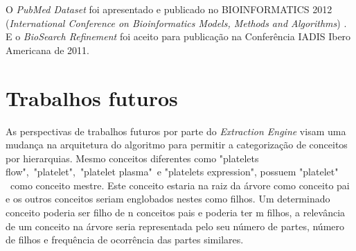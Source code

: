 O \emph{PubMed Dataset} foi apresentado e publicado no BIOINFORMATICS 2012 (\emph{International Conference on Bioinformatics Models, Methods and Algorithms}) \cite{Lassounski2012}. E o \emph{BioSearch Refinement} foi aceito para publicação na Conferência IADIS Ibero Americana de 2011.

\section{Trabalhos futuros}
As perspectivas de trabalhos futuros por parte do \emph{Extraction Engine} visam uma mudança na arquitetura do algoritmo para permitir a categorização de conceitos por hierarquias. Mesmo conceitos diferentes como "platelets flow",\ "platelet",\ "platelet plasma"\ e "platelets expression", possuem
 "platelet" \ como conceito mestre. Este conceito estaria na raiz da árvore como conceito pai e os outros conceitos seriam englobados nestes como filhos. Um determinado conceito poderia ser filho de n conceitos pais e poderia ter m filhos, a relevância de um conceito na árvore seria representada pelo seu número de partes, número de filhos e frequência de ocorrência das partes similares.
 
